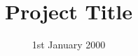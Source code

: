 \documentclass[a4paper, 10pt, oneside]{memoir}
\title          {Project Title}
\date           {1st January 2000}
\begin{document}
    \pagestyle{thesis}

    \thesisfront
    \maketitle
    \thesistoc

    \thesismain
    
    
    
    
    

    \thesisapp
    \thesisbib
    \begin{appendices}
%        
    \end{appendices}

    \thesisback
    
\end{document}
